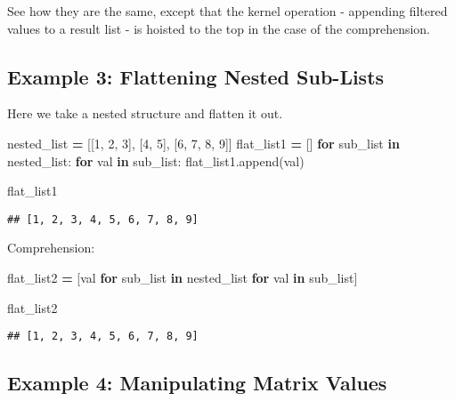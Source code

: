 \documentclass[
]{book}
\newenvironment{Shaded}{\begin{snugshade}}{\end{snugshade}}
\newcommand{\ControlFlowTok}[1]{\textcolor[rgb]{0.13,0.29,0.53}{\textbf{#1}}}
\newcommand{\DecValTok}[1]{\textcolor[rgb]{0.00,0.00,0.81}{#1}}
\newcommand{\KeywordTok}[1]{\textcolor[rgb]{0.13,0.29,0.53}{\textbf{#1}}}
\newcommand{\NormalTok}[1]{#1}
\newcommand{\OperatorTok}[1]{\textcolor[rgb]{0.81,0.36,0.00}{\textbf{#1}}}
\begin{document}
See how they are the same, except that the kernel operation - appending filtered values to a result list - is hoisted to the top in the case of the comprehension.

\subsection{Example 3: Flattening Nested Sub-Lists}\label{example-3-flattening-nested-sub-lists}

Here we take a nested structure and flatten it out.

\begin{Shaded}
\begin{Highlighting}[]
\NormalTok{nested\_list }\OperatorTok{=}\NormalTok{ [[}\DecValTok{1}\NormalTok{, }\DecValTok{2}\NormalTok{, }\DecValTok{3}\NormalTok{], [}\DecValTok{4}\NormalTok{, }\DecValTok{5}\NormalTok{], [}\DecValTok{6}\NormalTok{, }\DecValTok{7}\NormalTok{, }\DecValTok{8}\NormalTok{, }\DecValTok{9}\NormalTok{]]}
\NormalTok{flat\_list1 }\OperatorTok{=}\NormalTok{ []}
\ControlFlowTok{for}\NormalTok{ sub\_list }\KeywordTok{in}\NormalTok{ nested\_list:}
    \ControlFlowTok{for}\NormalTok{ val }\KeywordTok{in}\NormalTok{ sub\_list:}
\NormalTok{        flat\_list1.append(val)}

\NormalTok{flat\_list1}
\end{Highlighting}
\end{Shaded}

\begin{verbatim}
## [1, 2, 3, 4, 5, 6, 7, 8, 9]
\end{verbatim}

Comprehension:

\begin{Shaded}
\begin{Highlighting}[]
\NormalTok{flat\_list2 }\OperatorTok{=}\NormalTok{ [val }\ControlFlowTok{for}\NormalTok{ sub\_list }\KeywordTok{in}\NormalTok{ nested\_list }\ControlFlowTok{for}\NormalTok{ val }\KeywordTok{in}\NormalTok{ sub\_list]}

\NormalTok{flat\_list2}
\end{Highlighting}
\end{Shaded}

\begin{verbatim}
## [1, 2, 3, 4, 5, 6, 7, 8, 9]
\end{verbatim}

\subsection{Example 4: Manipulating Matrix Values}\label{example-4-manipulating-matrix-values}
\end{document}
